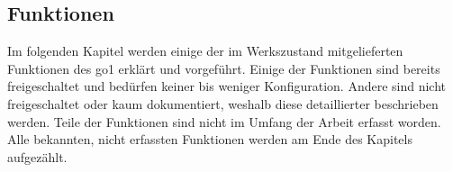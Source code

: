 \subsection{Funktionen}
\label{subsec:funktionen}

Im folgenden Kapitel werden einige der im Werkszustand mitgelieferten Funktionen des \gls{go1} erklärt und vorgeführt.
Einige der Funktionen sind bereits freigeschaltet und bedürfen keiner bis weniger Konfiguration.
Andere sind nicht freigeschaltet oder kaum dokumentiert, weshalb diese detaillierter beschrieben werden.
Teile der Funktionen sind nicht im Umfang der Arbeit erfasst worden.
Alle bekannten, nicht erfassten Funktionen werden am Ende des Kapitels aufgezählt.